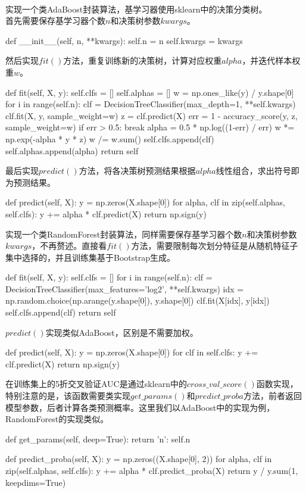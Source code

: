 \documentclass[a4paper,UTF8]{article}
\theoremstyle{definition}
\begin{document}
~\\
实现一个类AdaBoost封装算法，基学习器使用sklearn中的决策分类树。\\
首先需要保存基学习器个数$n$和决策树参数$kwargs$。
\begin{python}
def __init__(self, n, **kwargs):
	self.n = n
	self.kwargs = kwargs
\end{python}
然后实现$fit()$方法，重复训练新的决策树，计算对应权重$alpha$，并迭代样本权重$w$。
\begin{python}
def fit(self, X, y):
	self.clfs = []
	self.alphas = []
	w = np.ones_like(y) / y.shape[0]
	for i in range(self.n):
		clf = DecisionTreeClassifier(max_depth=1, **self.kwargs)
		clf.fit(X, y, sample_weight=w)
		z = clf.predict(X)
		err = 1 - accuracy_score(y, z, sample_weight=w)
		if err > 0.5:
			break
		alpha = 0.5 * np.log((1-err) / err)
		w *= np.exp(-alpha * y * z)
		w /= w.sum()
		self.clfs.append(clf)
		self.alphas.append(alpha)
	return self
\end{python}
最后实现$predict()$方法，将各决策树预测结果根据$alpha$线性组合，求出符号即为预测结果。
\begin{python}
def predict(self, X):
	y = np.zeros(X.shape[0])
	for alpha, clf in zip(self.alphas, self.clfs):
		y += alpha * clf.predict(X)
	return np.sign(y)
\end{python}
实现一个类RandomForest封装算法，同样需要保存基学习器个数$n$和决策树参数$kwargs$，不再赘述。直接看$fit()$方法，需要限制每次划分特征是从随机特征子集中选择的，并且训练集基于Bootstrap生成。
\begin{python}
def fit(self, X, y):
	self.clfs = []
	for i in range(self.n):
		clf = DecisionTreeClassifier(max_features='log2', **self.kwargs)
		idx = np.random.choice(np.arange(y.shape[0]), y.shape[0])
		clf.fit(X[idx], y[idx])
		self.clfs.append(clf)
	return self
\end{python}
$predict()$实现类似AdaBoost，区别是不需要加权。
\begin{python}
def predict(self, X):
	y = np.zeros(X.shape[0])
	for clf in self.clfs:
		y += clf.predict(X)
	return np.sign(y)
\end{python}
在训练集上的5折交叉验证AUC是通过sklearn中的$cross\_val\_score()$函数实现，特别注意的是，该函数需要类实现$get\_params()$和$predict\_proba$方法，前者返回模型参数，后者计算各类预测概率。这里我们以AdaBoost中的实现为例，RandomForest的实现类似。
\begin{python}
def get_params(self, deep=True):
	return {'n': self.n}

def predict_proba(self, X):
	y = np.zeros((X.shape[0], 2))
	for alpha, clf in zip(self.alphas, self.clfs):
		y += alpha * clf.predict_proba(X)
	return y / y.sum(1, keepdims=True)
\end{python}
\end{document}
